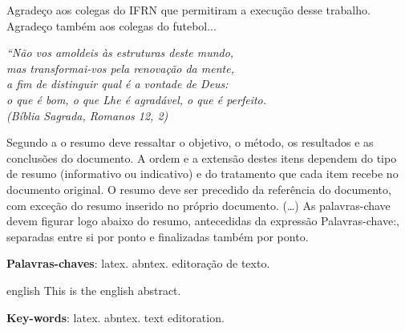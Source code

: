 \documentclass[12pt,brazilian,twoside]{abntex2}
\begin{document}
\begin{agradecimentos}
Agradeço aos colegas do IFRN que permitiram a execução desse trabalho.
Agradeço também aos colegas do futebol...
\end{agradecimentos}

\begin{epigrafe}
    \vspace*{\fill}
        \begin{flushright}
                \textit{``Não vos amoldeis às estruturas deste mundo, \\
                mas transformai-vos pela renovação da mente, \\
                a fim de distinguir qual é a vontade de Deus: \\
                o que é bom, o que Lhe é agradável, o que é perfeito.\\
                (Bíblia Sagrada, Romanos 12, 2)}
        \end{flushright}
\end{epigrafe}

\begin{resumo}
 Segundo a o resumo deve ressaltar o
 objetivo, o método, os resultados e as conclusões do documento. A ordem e a extensão
 destes itens dependem do tipo de resumo (informativo ou indicativo) e do
 tratamento que cada item recebe no documento original. O resumo deve ser
 precedido da referência do documento, com exceção do resumo inserido no
 próprio documento. (\ldots) As palavras-chave devem figurar logo abaixo do
 resumo, antecedidas da expressão Palavras-chave:, separadas entre si por
 ponto e finalizadas também por ponto.
 
 \vspace{\onelineskip}
   
 \noindent
 \textbf{Palavras-chaves}: latex. abntex. editoração de texto.
\end{resumo}
 
\begin{resumo}[Abstract]
 \begin{otherlanguage*}{english}
   This is the english abstract.
 
   \vspace{\onelineskip}
 
   \noindent
   \textbf{Key-words}: latex. abntex. text editoration.
 \end{otherlanguage*}
\end{resumo}

\listoffigures*
\cleardoublepage
 
\end{document}
